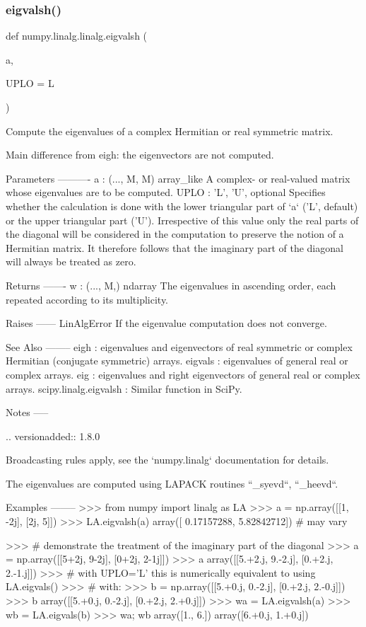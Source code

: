 \subsubsection{\texorpdfstring{eigvalsh()}{eigvalsh()}}
{\footnotesize\ttfamily def numpy.\+linalg.\+linalg.\+eigvalsh (\begin{DoxyParamCaption}\item[{}]{a,  }\item[{}]{U\+P\+LO = {\ttfamily \textquotesingle{}L\textquotesingle{}} }\end{DoxyParamCaption})}

\begin{DoxyVerb}Compute the eigenvalues of a complex Hermitian or real symmetric matrix.

Main difference from eigh: the eigenvectors are not computed.

Parameters
----------
a : (..., M, M) array_like
    A complex- or real-valued matrix whose eigenvalues are to be
    computed.
UPLO : {'L', 'U'}, optional
    Specifies whether the calculation is done with the lower triangular
    part of `a` ('L', default) or the upper triangular part ('U').
    Irrespective of this value only the real parts of the diagonal will
    be considered in the computation to preserve the notion of a Hermitian
    matrix. It therefore follows that the imaginary part of the diagonal
    will always be treated as zero.

Returns
-------
w : (..., M,) ndarray
    The eigenvalues in ascending order, each repeated according to
    its multiplicity.

Raises
------
LinAlgError
    If the eigenvalue computation does not converge.

See Also
--------
eigh : eigenvalues and eigenvectors of real symmetric or complex Hermitian
       (conjugate symmetric) arrays.
eigvals : eigenvalues of general real or complex arrays.
eig : eigenvalues and right eigenvectors of general real or complex
      arrays.
scipy.linalg.eigvalsh : Similar function in SciPy.

Notes
-----

.. versionadded:: 1.8.0

Broadcasting rules apply, see the `numpy.linalg` documentation for
details.

The eigenvalues are computed using LAPACK routines ``_syevd``, ``_heevd``.

Examples
--------
>>> from numpy import linalg as LA
>>> a = np.array([[1, -2j], [2j, 5]])
>>> LA.eigvalsh(a)
array([ 0.17157288,  5.82842712]) # may vary

>>> # demonstrate the treatment of the imaginary part of the diagonal
>>> a = np.array([[5+2j, 9-2j], [0+2j, 2-1j]])
>>> a
array([[5.+2.j, 9.-2.j],
       [0.+2.j, 2.-1.j]])
>>> # with UPLO='L' this is numerically equivalent to using LA.eigvals()
>>> # with:
>>> b = np.array([[5.+0.j, 0.-2.j], [0.+2.j, 2.-0.j]])
>>> b
array([[5.+0.j, 0.-2.j],
       [0.+2.j, 2.+0.j]])
>>> wa = LA.eigvalsh(a)
>>> wb = LA.eigvals(b)
>>> wa; wb
array([1., 6.])
array([6.+0.j, 1.+0.j])\end{DoxyVerb}
